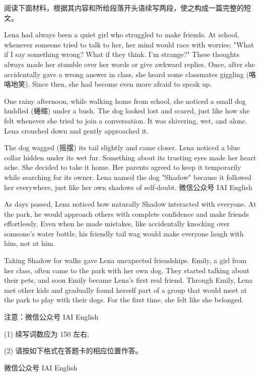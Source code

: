 \documentclass{英语试卷}
\begin{document}
\par 阅读下面材料，根据其内容和所给段落开头语续写两段，使之构成一篇完整的短文。\par
\par Lena had always been a quiet girl who struggled to make friends. At school, whenever someone tried to talk to her, her mind would race with worries: "What if I say something wrong? What if they think. I'm strange?" These thoughts always made her stumble over her words or give awkward replies. Once, after she accidentally gave a wrong answer in class, she heard some classmates giggling (咯咯地笑). Since then, she had become even more afraid to speak up.\par
\par One rainy afternoon, while walking home from school, she noticed a small dog huddled (蜷缩) under a bush. The dog looked lost and scared, just like how she felt whenever she tried to join a conversation. It was shivering, wet, and alone. Lena crouched down and gently approached it.\par
\par The dog wagged (摇摆) its tail slightly and came closer. Lena noticed a blue collar hidden under its wet fur. Something about its trusting eyes made her heart ache. She decided to take it home. Her parents agreed to keep it temporarily while searching for its owner. Lena named the dog "Shadow" because it followed her everywhere, just like her own shadows of self-doubt. 微信公众号 IAI English\par
\par As days passed, Lena noticed how naturally Shadow interacted with everyone. At the park, he would approach others with complete confidence and make friends effortlessly. Even when he made mistakes, like accidentally knocking over someone's water bottle, his friendly tail wag would make everyone laugh with him, not at him.\par
\par Taking Shadow for walks gave Lena unexpected friendships. Emily, a girl from her class, often came to the park with her own dog. They started talking about their pets, and soon Emily became Lena's first real friend. Through Emily, Lena met other kids and gradually found herself part of a group that would meet at the park to play with their dogs. For the first time, she felt like she belonged.\par
\par 注意：微信公众号 IAI English\par
\par (1) 续写词数应为 150 左右;\par
\par (2) 请按如下格式在答题卡的相应位置作答。\par
{}
\par 微信公众号 IAI English\par
{}
\end{document}
